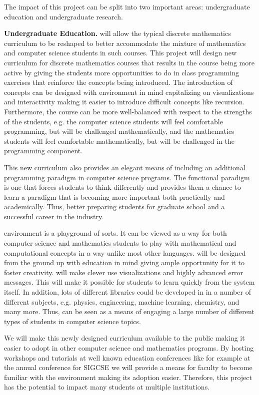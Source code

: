 The impact of this project can be split into two important areas:
undergraduate education and undergraduate research.

\textbf{Undergraduate Education.}  \thelang{} will allow the typical
discrete mathematics curriculum to be reshaped to better accommodate
the mixture of mathematics and computer science students in such
courses.  This project will design new curriculum for discrete
mathematics courses that results in the course being more active by
giving the students more opportunities to do in class programming
exercises that reinforce the concepts being introduced.  The
introduction of concepts can be designed with \thelang{} environment
in mind capitalizing on visualizations and interactivity making it
easier to introduce difficult concepts like recursion.  Furthermore,
the course can be more well-balanced with respect to the strengths of
the students, e.g. the computer science students will feel comfortable
programming, but will be challenged mathematically, and the
mathematics students will feel comfortable mathematically, but will be
challenged in the programming component.

This new curriculum also provides an elegant means of including an
additional programming paradigm in computer science programs.  The
functional paradigm is one that forces students to think differently
and provides them a chance to learn a paradigm that is becoming more
important both practically and academically.  Thus, better preparing
students for graduate school and a successful career in the industry.

\thelang{} environment is a playground of sorts.  It can be viewed as
a way for both computer science and mathematics students to play with
mathematical and computational concepts in a way unlike most other
languages.  \thelang{} will be designed from the ground up with
education in mind giving ample opportunity for it to foster
creativity.  \thelang{} will make clever use visualizations and highly
advanced error messages.  This will make it possible for students to
learn quickly from the system itself.  In addition, lots of different
libraries could be developed in \thelang{} in a number of different
subjects, e.g. physics, engineering, machine learning, chemistry, and
many more.  Thus, \thelang{} can be seen as a means of engaging a
large number of different types of students in computer science
topics.

We will make this newly designed curriculum available to the public
making it easier to adopt in other computer science and mathematics
programs.  By hosting workshops and tutorials at well known education
conferences like for example at the annual conference for SIGCSE we
will provide a means for faculty to become familiar with the
\thelang{} environment making its adoption easier.  Therefore, this
project has the potential to impact many students at multiple
institutions.

